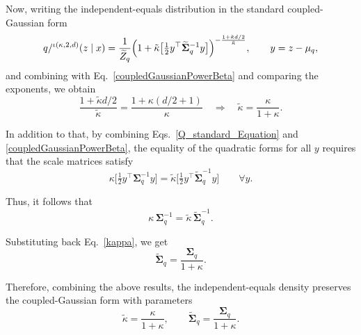 \documentclass[twoside,11pt]{article}
\renewenvironment{proof}{\par\noindent{\bf Proof\ }}{\hfill\BlackBox\par\vspace{2mm}}
\begin{document}
\begin{proof}
Now, writing the independent-equals distribution in the standard coupled-Gaussian form
\begin{equation}\label{Q_standard_Equation}
q/^{\iota(\kappa,2,d)}(z \mid x)
=
\frac{1}{\widetilde Z_q}
\Bigl(1+\tilde{\kappa}\bigl[\tfrac12 y^\top
\widetilde{\boldsymbol{\Sigma}}_q^{-1}y\bigr]
\Bigr)^{-\frac{1+\tilde{\kappa} d/2}{\tilde{\kappa}}},\qquad y=z-\mu_q,
\end{equation}
and combining with Eq.~\eqref{coupledGaussianPowerBeta} and comparing the exponents, we obtain
\begin{equation}\label{kappa}
\frac{1+\tilde{\kappa} d/2}{\tilde{\kappa}}
=
\frac{1+\kappa(d/2+1)}{\kappa}
\quad\Longrightarrow\quad
\tilde{\kappa}
=
\frac{\kappa}{1+\kappa}.
\end{equation}

In addition to that, by combining
Eqs.~\eqref{Q_standard_Equation}
and \eqref{coupledGaussianPowerBeta},
the equality of the quadratic forms for all $y$ requires that the scale matrices satisfy
\[
\kappa\bigl[\tfrac12y^{\!\intercal}\boldsymbol{\Sigma}_q^{-1}y\bigr]=
\tilde{\kappa}\bigl[\tfrac12y^{\!\intercal}
\widetilde{\boldsymbol{\Sigma}}_q^{-1}y\bigr]
\qquad \forall y.
\]

Thus, it follows that
\[
\kappa\,\boldsymbol{\Sigma}_q^{-1}
=
\tilde{\kappa}\,\widetilde{\boldsymbol{\Sigma}}_q^{-1}.
\]

Substituting back Eq.~\eqref{kappa}, we get
\begin{equation}
\widetilde{\boldsymbol{\Sigma}}_q
=
\frac{\boldsymbol{\Sigma}_q}{1+\kappa}.
\end{equation}

Therefore, combining the above results, the independent-equals density preserves the coupled-Gaussian form with parameters
\[
\tilde{\kappa}=\frac{\kappa}{1+\kappa},
\qquad
\widetilde{\boldsymbol{\Sigma}}_q
=
\frac{\boldsymbol{\Sigma}_q}{1+\kappa}.
\]
\end{proof}
\end{document}
